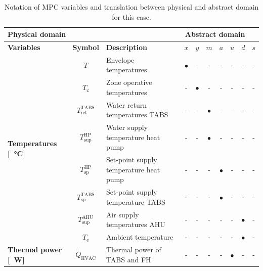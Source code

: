 \documentclass[10pt]{article}
\begin{document}
% 
\begin{table}[!htbp]
	\centering
	\caption{Notation of MPC variables and translation between physical and abstract domain for this case. }
	\label{tab:mpc_form:translation}
	\begin{tabular}{l|c|l|ccccccc}
		\toprule
		\multicolumn{3}{l}{\textbf{Physical domain}} &  \multicolumn{6}{r}{\textbf{Abstract domain}} \\
		\toprule
		\textbf{Variables} & \textbf{Symbol} & \textbf{Description} & \textbf{$x$} & \textbf{$y$} & \textbf{$m$} & \textbf{$a$} & \textbf{$u$} & \textbf{$d$}   & \textbf{$s$} \\ 
		\midrule
		\multirow{8}{*}{\textbf{Temperatures [\SI{}{\celsius}]}} & $T$ & Envelope temperatures & $\bullet$ & -  & - & - & - & - & -\\ 
		& $T_{\text{z}}$ & Zone operative temperatures  & - & $\bullet$ & - & - & - & - & - \\
		& $T^{\text{TABS}}_{\text{ret}}$ & Water return temperatures TABS &  - & -& $\bullet$ & - & - &  -& -\\
		& $T^{\text{HP}}_{\text{sup}}$ & Water supply temperature heat pump&  - & - & $\bullet$ & -  & - & - & -\\
		& $T^{\text{HP}}_{\text{sp}}$ & Set-point supply temperature heat pump&  - & - & - & $\bullet$  & - & - & -\\
		& $T^{\text{TABS}}_{\text{sp}}$ & Set-point supply temperature TABS&  - & - & - & $\bullet$ & - & -& -\\
		& $T^{\text{AHU}}_{\text{sup}}$ & Air supply temperatures AHU &  - & - & - & - & - & $\bullet$ & - \\
		& $T_\text{e}$ & Ambient temperature &  - & -& -& - & - & $\bullet$ & -\\
		\midrule
		\multirow{3}{*}{\textbf{Thermal power [\SI{}{\watt}]}} 
		& $\dot{Q}_{\text{HVAC}}$ & Thermal power of  TABS and FH & - & -& -& - &  $\bullet$ &- & - \\

\end{tabular}
\end{table}
\end{document}
